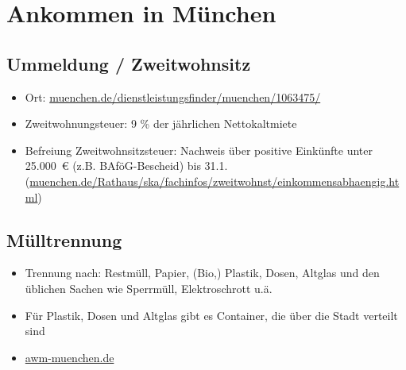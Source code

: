﻿
\section{Ankommen in München}

\subsection{Ummeldung / Zweitwohnsitz}
\begin{itemize}
	\item Ort: \url{muenchen.de/dienstleistungsfinder/muenchen/1063475/}
	\item Zweitwohnungsteuer: 9 \% der jährlichen Nettokaltmiete
	\item Befreiung Zweitwohnsitzsteuer: Nachweis über positive Einkünfte unter 25.000~€ (z.B. BAföG-Bescheid) bis 31.1. \newline (\url{muenchen.de/Rathaus/ska/fachinfos/zweitwohnst/einkommensabhaengig.html})
\end{itemize}

\subsection{Mülltrennung}
\begin{itemize}
	\item Trennung nach: Restmüll, Papier, (Bio,) Plastik, Dosen, Altglas und den üblichen Sachen wie Sperrmüll, Elektroschrott u.ä.
	\item Für Plastik, Dosen und Altglas gibt es Container, die über die Stadt verteilt sind
	\item \url{awm-muenchen.de}
\end{itemize}


